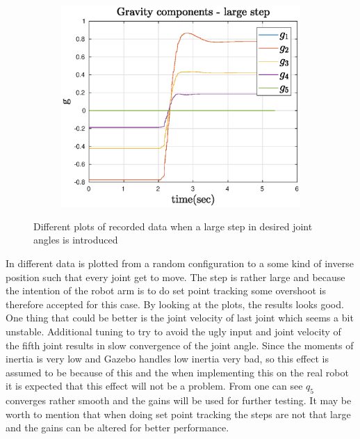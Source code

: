 \begin{figure}[htbp]
\begin{subfigure}[htbp]{0.45\textwidth}
        \caption{ }
    \end{subfigure}
    ~
    \begin{subfigure}[htbp]{0.45\textwidth}
        \centering
        \includegraphics[width = \picsSiz\linewidth]{img/LSgrav.eps}
        \caption{ }
    \end{subfigure}
    \caption{Different plots of recorded data when a large step in desired joint angles is introduced}
    \label{fig:LS}
\end{figure}

In  different data is plotted from a random configuration to a some kind of inverse position such that every joint get to move. The step is rather large and because the intention of the robot arm is to do set point tracking some overshoot is therefore accepted for this case. By looking at the plots, the results looks good. One thing that could be better is the joint velocity of last joint which seems a bit unstable. Additional tuning to try to avoid the ugly input and joint velocity of the fifth joint results in slow convergence of the joint angle. Since the moments of inertia is very low and Gazebo handles low inertia very bad, so this effect is assumed to be because of this and the when implementing this on the real robot it is expected that this effect will not be a problem. From  one can see $q_5$ converges rather smooth and the gains will be used for further testing. It may be worth to mention that when doing set point tracking the steps are not that large and the gains can be altered for better performance.  





